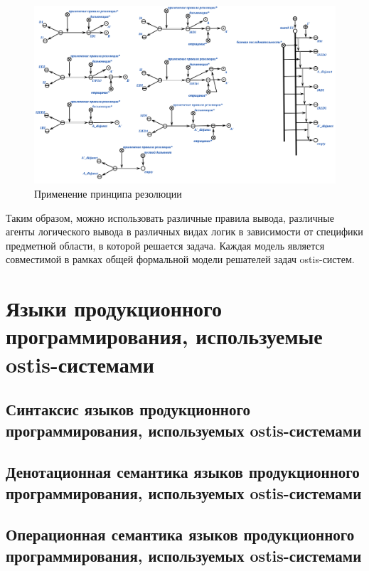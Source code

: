 \begin{figure}[H]
	\includegraphics[scale=0.7]{author/part3/figures/resolution_inference.png}
	\caption{Применение принципа резолюции}
	\label{fig:resolution_inference}
\end{figure}

Таким образом, можно использовать различные правила вывода, различные агенты логического вывода в различных видах логик в зависимости от специфики предметной области, в которой решается задача. Каждая модель является совместимой в рамках общей формальной модели решателей задач ostis-систем.

\section{Языки продукционного программирования, используемые ostis-системами}
\subsection{Синтаксис языков продукционного программирования, используемых ostis-системами}
\subsection{Денотационная семантика языков продукционного программирования, используемых ostis-системами}
\subsection{Операционная семантика языков продукционного программирования, используемых ostis-системами}

%